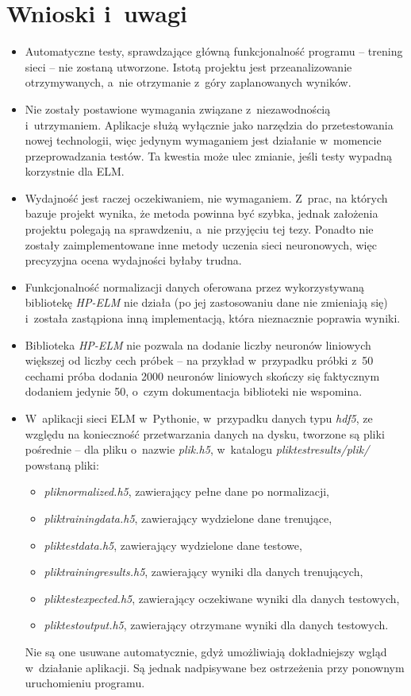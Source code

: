 \documentclass[pl]{minipw} %
\begin{document}
\section{Wnioski i~uwagi}
\begin{itemize}
\item Automatyczne testy, sprawdzające główną funkcjonalność programu -- trening sieci -- nie zostaną utworzone. Istotą projektu jest przeanalizowanie otrzymywanych, a~nie otrzymanie z~góry zaplanowanych wyników.
\item Nie zostały postawione wymagania związane z~niezawodnością i~utrzymaniem. Aplikacje służą wyłącznie jako narzędzia do przetestowania nowej technologii, więc jedynym wymaganiem jest działanie w~momencie przeprowadzania testów. Ta kwestia może ulec zmianie, jeśli testy wypadną korzystnie dla ELM.
\item Wydajność jest raczej oczekiwaniem, nie wymaganiem. Z~prac, na których bazuje projekt wynika, że metoda powinna być szybka, jednak założenia projektu polegają na sprawdzeniu, a~nie przyjęciu tej tezy. Ponadto nie zostały zaimplementowane inne metody uczenia sieci neuronowych, więc precyzyjna ocena wydajności byłaby trudna.
\item Funkcjonalność normalizacji danych oferowana przez wykorzystywaną bibliotekę \textit{HP-ELM} nie działa (po jej zastosowaniu dane nie zmieniają się) i~została zastąpiona inną implementacją, która nieznacznie poprawia wyniki.
\item Biblioteka \textit{HP-ELM} nie pozwala na dodanie liczby neuronów liniowych większej od liczby cech próbek -- na przykład w~przypadku próbki z~50 cechami próba dodania 2000 neuronów liniowych skończy się faktycznym dodaniem jedynie 50, o~czym dokumentacja biblioteki nie wspomina.
\item W~aplikacji sieci ELM w~Pythonie, w~przypadku danych typu \textit{hdf5}, ze względu na konieczność przetwarzania danych na dysku, tworzone są pliki pośrednie -- dla pliku o~nazwie \textit{plik.h5}, w~katalogu \textit{plik\textunderscore test\textunderscore results/plik/} powstaną pliki:
\begin{itemize}
\item \textit{plik\textunderscore normalized.h5}, zawierający pełne dane po normalizacji, 
\item \textit{plik\textunderscore training\textunderscore data.h5}, zawierający wydzielone dane trenujące, 
\item \textit{plik\textunderscore test\textunderscore data.h5}, zawierający wydzielone dane testowe,
\item \textit{plik\textunderscore training\textunderscore results.h5}, zawierający wyniki dla danych trenujących,
\item \textit{plik\textunderscore test\textunderscore expected.h5}, zawierający oczekiwane wyniki dla danych testowych,
\item \textit{plik\textunderscore test\textunderscore output.h5}, zawierający otrzymane wyniki dla danych testowych.
\end{itemize} 
Nie są one usuwane automatycznie, gdyż umożliwiają dokładniejszy wgląd w~działanie aplikacji. Są jednak nadpisywane bez ostrzeżenia przy ponownym uruchomieniu programu.
\end{itemize}
\label{wnioski2}
\clearpage
\end{document}
